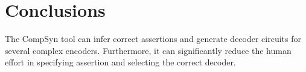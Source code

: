 \documentclass[runningheads,a4paper,orivec]{llncs}
\begin{document}
\section{Conclusions}\label{sec_conclude}
The CompSyn tool can infer correct assertions and generate decoder circuits for several complex encoders.
Furthermore,
it can significantly reduce the human effort in specifying assertion and selecting the correct decoder.









% 
\end{document}
